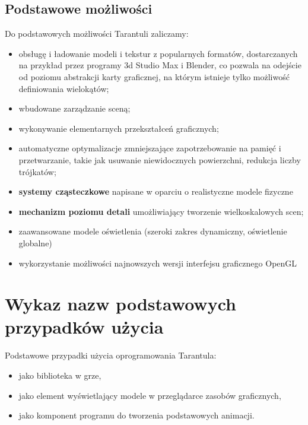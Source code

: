 \documentclass[11pt,leqno]{article}
\begin{document}
\subsection{Podstawowe możliwości}
\noindent
Do podstawowych możliwości Tarantuli zaliczamy:
\begin{itemize}
 \item obsługę i ładowanie modeli i tekstur z popularnych formatów, dostarczanych na przykład przez programy 3d Studio Max i Blender, co pozwala na odejście od poziomu abstrakcji karty graficznej, na którym istnieje tylko możliwość definiowania wielokątów;
  \item wbudowane zarządzanie sceną;
\item wykonywanie elementarnych przekształceń graficznych;
\item automatyczne optymalizacje zmniejszające zapotrzebowanie na pamięć i przetwarzanie, takie jak usuwanie niewidocznych powierzchni, redukcja liczby trójkatów;
\item {\bf systemy cząsteczkowe} napisane w oparciu o realistyczne modele fizyczne
\item {\bf mechanizm poziomu detali} umożliwiający tworzenie wielkoskalowych scen;
\item zaawansowane modele oświetlenia (szeroki zakres dynamiczny, oświetlenie globalne)
\item wykorzystanie możliwości najnowszych wersji interfejsu graficznego OpenGL
\end{itemize}


\section{Wykaz nazw podstawowych przypadków użycia}
Podstawowe przypadki użycia oprogramowania Tarantula:
\begin{itemize}
\item jako biblioteka w grze,
\item jako element wyświetlający modele w przeglądarce zasobów graficznych,
\item jako komponent programu do tworzenia podstawowych animacji.
\end{itemize}
\end{document}
